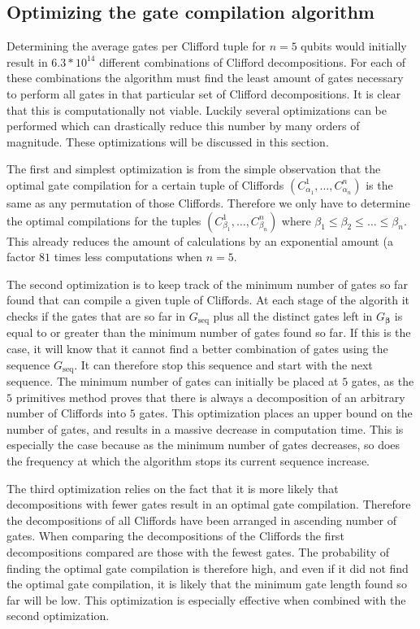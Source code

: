     \subsection{Optimizing the gate compilation algorithm}
      \label{Optimizing the gate compilation algorithm}
      Determining the average gates per Clifford tuple for $n=5$ qubits would initially result in $6.3*10^{14}$ different combinations of Clifford decompositions. For each of these combinations the algorithm must find the least amount of gates necessary to perform all gates in that particular set of Clifford decompositions. It is clear that this is computationally not viable. Luckily several optimizations can be performed which can drastically reduce this number by many orders of magnitude. These optimizations will be discussed in this section.

      The first and simplest optimization is from the simple observation that the optimal gate compilation for a certain tuple of Cliffords $\left(C_{\alpha_1}^1, \dots, C_{\alpha_n}^n\right)$ is the same as any permutation of those Cliffords. Therefore we only have to determine the optimal compilations for the tuples $\left(C_{\beta_1}^1, \dots, C_{\beta_n}^n\right)$ where $\beta_1 \leq \beta_2 \leq \dots \leq \beta_n$. This already reduces the amount of calculations by an exponential amount (a factor $81$ times less computations when $n=5$.

      The second optimization is to keep track of the minimum number of gates so far found that can compile a given tuple of Cliffords. At each stage of the algorith it checks if the gates that are so far in $G_\text{seq}$ plus all the distinct gates left in $G_{\bm{\beta}}$ is equal to or greater than the minimum number of gates found so far. If this is the case, it will know that it cannot find a better combination of gates using the sequence $G_\text{seq}$. It can therefore stop this sequence and start with the next sequence. The minimum number of gates can initially be placed at $5$ gates, as the $5$ primitives method proves that there is always a decomposition of an arbitrary number of Cliffords into $5$ gates. This optimization places an upper bound on the number of gates, and results in a massive decrease in computation time. This is especially the case because as the minimum number of gates decreases, so does the frequency at which the algorithm stops its current sequence increase.

      The third optimization relies on the fact that it is more likely that decompositions with fewer gates result in an optimal gate compilation. Therefore the decompositions of all Cliffords have been arranged in ascending number of gates. When comparing the decompositions of the Cliffords the first decompositions compared are those with the fewest gates. The probability of finding the optimal gate compilation is therefore high, and even if it did not find the optimal gate compilation, it is likely that the minimum gate length found so far will be low. This optimization is especially effective when combined with the second optimization.

